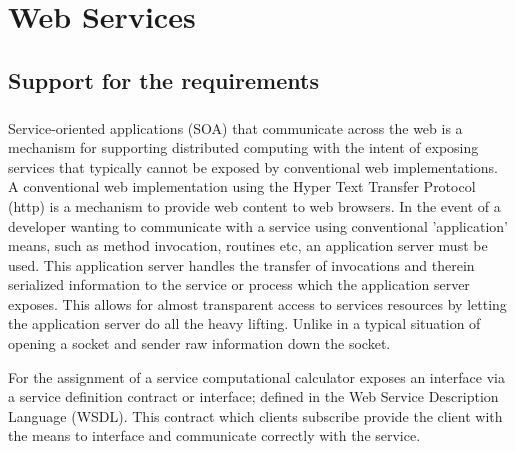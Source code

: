 \chapter{Web Services}
\setcounter{page}{1}
	\section{Support for the requirements}
		\vspace{5mm}
	    \begin{multicols}{2}
		\paragraph{}
			
		Service-oriented applications (SOA) that communicate across the web	is a mechanism for supporting distributed computing 
		with the intent of exposing services that typically cannot be exposed by conventional web implementations.
		\newline  
		\newline 
		A conventional web implementation using the Hyper Text Transfer Protocol (http) is a mechanism to provide web content to web browsers.
		In the event of a developer wanting to communicate with a service using conventional 'application' means, such as method invocation, routines
		etc, an application server must be used.  This application server handles the transfer of invocations and therein serialized information to the 
		service or process which the application server exposes.  This allows for almost transparent access to services resources by letting the application
		server do all the heavy lifting.  Unlike in a typical situation of opening a socket and sender raw information down the socket. 
		\newline

		For the assignment of a service computational calculator exposes an interface via a service definition contract or interface; defined in the 
		Web Service Description Language (WSDL).  This contract which clients subscribe provide the client with the means to interface and communicate 
		correctly with the service.  
	
		\end{multicols}
		
